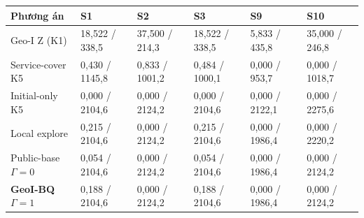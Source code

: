 \par\smallskip\noindent\begin{tabularx}{\linewidth}{@{}P{3.6cm}XXXXX@{}}\toprule
\textbf{Phương án} & \textbf{S1} & \textbf{S2} & \textbf{S3} & \textbf{S9} & \textbf{S10} \\
\midrule
Geo-I Z (K1) & 18{,}522 / 338{,}5 & 37{,}500 / 214{,}3 & 18{,}522 / 338{,}5 & 5{,}833 / 435{,}8 & 35{,}000 / 246{,}8 \\
Service-cover K5 & 0{,}430 / 1145{,}8 & 0{,}833 / 1001{,}2 & 0{,}484 / 1000{,}1 & 0{,}000 / 953{,}7 & 0{,}000 / 1018{,}7 \\
Initial-only K5 & 0{,}000 / 2104{,}6 & 0{,}000 / 2124{,}2 & 0{,}000 / 2104{,}6 & 0{,}000 / 2122{,}1 & 0{,}000 / 2275{,}6 \\
Local explore & 0{,}215 / 2104{,}6 & 0{,}000 / 2124{,}2 & 0{,}215 / 2104{,}6 & 0{,}000 / 1986{,}4 & 0{,}000 / 2220{,}2 \\
Public-base $\Gamma=0$ & 0{,}054 / 2104{,}6 & 0{,}000 / 2124{,}2 & 0{,}054 / 2104{,}6 & 0{,}000 / 1986{,}4 & 0{,}000 / 2124{,}2 \\
\textbf{GeoI-BQ $\Gamma=1$} & 0{,}188 / 2104{,}6 & 0{,}000 / 2124{,}2 & 0{,}188 / 2104{,}6 & 0{,}000 / 1986{,}4 & 0{,}000 / 2124{,}2 \\
\bottomrule\end{tabularx}\par\smallskip
